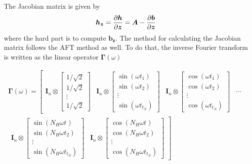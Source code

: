 The Jacobian matrix is given by
\begin{equation}
  \label{eq:hb_jac1}
    \bm h_{\bm z} = \frac{\partial \bm h}{\partial \bm z} = \bm A - \frac{\partial \bm b}{\partial \bm z}
\end{equation}
where the hard part is to compute $\bm b_{\bm z}$. The method for calculating
the Jacobian matrix follows the AFT method as well. To do that, the inverse
Fourier transform is written as the linear operator $\bm \Gamma(\omega)$

\begin{equation}
  \label{eq:hb_gamma}
  \begin{aligned}
    \bm \Gamma(\omega) =
    \left[
  \begin{matrix}
    \bm{I}_n \otimes
    \begin{bmatrix}
      1/\sqrt{2} \\ 1/\sqrt{2} \\ \vdots \\ 1/\sqrt{2}
    \end{bmatrix} &
    \bm{I}_n \otimes
    \begin{bmatrix}
      \sin(\omega t_1) \\ \sin(\omega t_2) \\ \vdots \\ \sin(\omega t_{t_N})
    \end{bmatrix} &
    \bm{I}_n \otimes
    \begin{bmatrix}
      \cos(\omega t_1) \\ \cos(\omega t_2) \\ \vdots \\ \cos(\omega t_{t_N})
    \end{bmatrix}&
        \cdots
  \end{matrix}
\right. \\
\left.
  \begin{matrix}
    \bm{I}_n \otimes
    \begin{bmatrix}
      \sin(N_H\omega t_{}) \\ \sin(N_H\omega t_2) \\ \vdots \\ \sin(N_H\omega t_{t_N})
    \end{bmatrix} &
    \bm{I}_n \otimes
    \begin{bmatrix}
      \cos(N_H\omega t_{}) \\ \cos(N_H\omega t_2) \\ \vdots \\ \cos(N_H\omega t_{t_N})
    \end{bmatrix}
  \end{matrix}
\right]
\end{aligned}
\end{equation}

